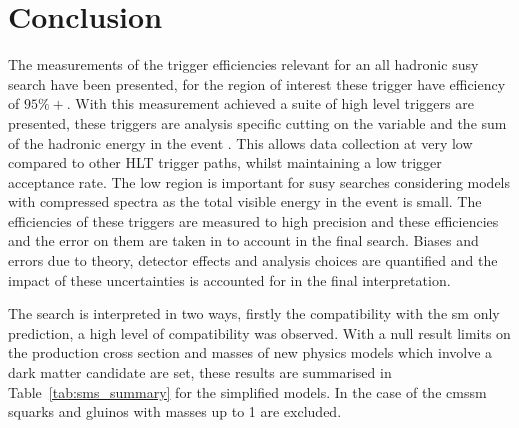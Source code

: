 \chapter{Conclusion} %
\label{cha:conclusion}
The measurements of the \Lone trigger efficiencies relevant for an all hadronic 
\ac{susy} search have been presented, for the region of interest these trigger 
have efficiency of $95\%+$. With this measurement achieved a suite of high 
level triggers are presented, these triggers are analysis specific cutting on 
the \alt variable and the sum of the hadronic energy in the event \HT. This 
allows data collection at very low \HT compared to other HLT trigger paths, 
whilst maintaining a low trigger acceptance rate. The low \HT region is 
important for \ac{susy} searches considering models with compressed spectra as 
the total visible energy in the event is small. The efficiencies of these 
triggers are measured to high precision and these efficiencies and the error on 
them are taken in to account in the final search. Biases and errors due to 
theory, detector effects and analysis choices are quantified and the impact of 
these uncertainties is accounted for in the final interpretation.

The search is interpreted in two ways, firstly the compatibility with the 
\ac{sm} only prediction, a high level of compatibility was observed. With a 
null result limits on the production cross section and masses of new physics 
models which involve a dark matter candidate are set, these results are 
summarised in Table~\ref{tab:sms_summary} for the simplified models. In the 
case of the \ac{cmssm} squarks and gluinos with masses up to \unit{1}{\TeV} are 
excluded.


